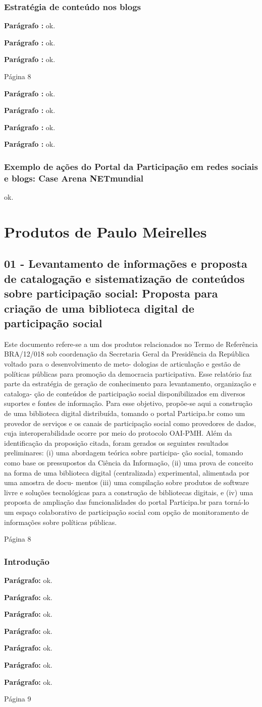 \documentclass[12pt]{report}
\newcommand{\pp}[1]{

\textbf{Parágrafo #1:}
}
\newcommand{\p}[0]{

\textbf{Parágrafo:}
}
\newcommand{\PP}[1]{

\noindent Página #1

}
\begin{document}
\section{Estratégia de conteúdo nos blogs}
\pp{} ok.
\pp{} ok.
\pp{} ok.
\PP{8}
\pp{} ok.
\pp{} ok.
\pp{} ok.
\pp{} ok.
\section{Exemplo de ações do Portal da Participação em redes sociais e blogs: Case Arena NETmundial}
ok.

\part{Produtos de Paulo Meirelles}
\chapter{01 - Levantamento de informações e proposta de catalogação e
sistematização de conteúdos sobre participação social: Proposta para criação de uma biblioteca digital de participação social}
Este documento refere-se a um dos produtos relacionados no Termo de Referência BRA/12/018 sob
coordenação da Secretaria Geral da Presidência da República voltado para o desenvolvimento de meto-
dologias de articulação e gestão de políticas públicas para promoção da democracia participativa. Esse
relatório faz parte da estratégia de geração de conhecimento para levantamento, organização e cataloga-
ção de conteúdos de participação social disponibilizados em diversos suportes e fontes de informação.
Para esse objetivo, propõe-se aqui a construção de uma biblioteca digital distribuída, tomando o portal
Participa.br como um provedor de serviços e os canais de participação social como provedores de dados,
cuja interoperabilidade ocorre por meio do protocolo OAI-PMH. Além da identificação da proposição
citada, foram gerados os seguintes resultados preliminares: (i) uma abordagem teórica sobre participa-
ção social, tomando como base os pressupostos da Ciência da Informação, (ii) uma prova de conceito
na forma de uma biblioteca digital (centralizada) experimental, alimentada por uma amostra de docu-
mentos (iii) uma compilação sobre produtos de software livre e soluções tecnológicas para a construção
de bibliotecas digitais, e (iv) uma proposta de ampliação das funcionalidades do portal Participa.br para
torná-lo um espaço colaborativo de participação social com opção de monitoramento de informações
sobre políticas públicas.
\PP 8
\section{Introdução}
\p ok.
\p ok.
\p ok.
\p ok.
\p ok.
\p ok.
\p ok.
\PP 9
\end{document}
